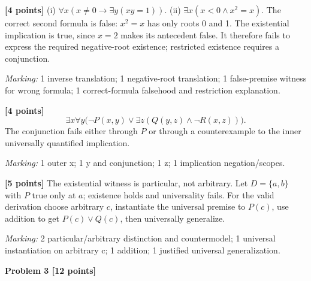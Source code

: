 \documentclass[12pt,letterpaper]{article}
\newcommand{\problemheading}[2][5\baselineskip]{\Needspace{#1}\par\noindent\hspace*{-0.625in}\textbf{#2}\par\nobreak\vspace{0.3em}}
\begin{document}
\begin{description}[font=\normalfont,leftmargin=1.2em,labelsep=0.4em]
\item[(a)] \textbf{[4 points]} (i) $\forall x(x\ne0\to\exists y(xy=1))$. (ii) $\exists x(x<0\land x^2=x)$. The correct second formula is false: $x^2=x$ has only roots 0 and 1. The existential implication is true, since $x=2$ makes its antecedent false. It therefore fails to express the required negative-root existence; restricted existence requires a conjunction.
\par\textit{Marking:} 1 inverse translation; 1 negative-root translation; 1 false-premise witness for wrong formula; 1 correct-formula falsehood and restriction explanation.
\item[(b)] \textbf{[4 points]} \[\exists x\forall y\bigl(\neg P(x,y)\lor\exists z(Q(y,z)\land\neg R(x,z))\bigr).\] The conjunction fails either through $P$ or through a counterexample to the inner universally quantified implication.
\par\textit{Marking:} 1 outer x; 1 y and conjunction; 1 z; 1 implication negation/scopes.
\item[(c)] \textbf{[5 points]} The existential witness is particular, not arbitrary. Let $D=\{a,b\}$ with $P$ true only at $a$; existence holds and universality fails. For the valid derivation choose arbitrary $c$, instantiate the universal premise to $P(c)$, use addition to get $P(c)\lor Q(c)$, then universally generalize.
\par\textit{Marking:} 2 particular/arbitrary distinction and countermodel; 1 universal instantiation on arbitrary c; 1 addition; 1 justified universal generalization.
\end{description}
\vspace{0.65em}
\problemheading[\dimexpr 3\baselineskip+4\baselineskip\relax]{Problem 3 [12 points]}
\end{document}
